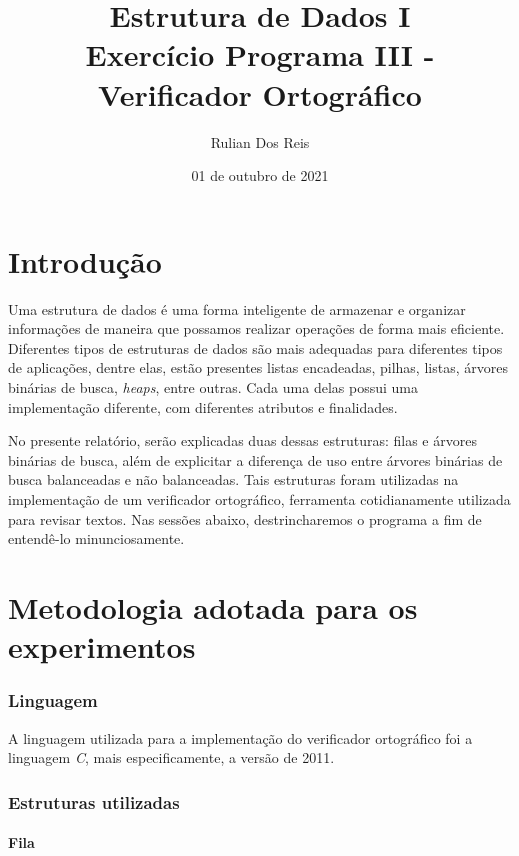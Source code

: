 \documentclass[12pt]{article}
\title{Estrutura de Dados I \\ 
	Exercício Programa III - Verificador Ortográfico	
}
\author{Rulian Dos Reis}
\date{01 de outubro de 2021}
\begin{document}
	\maketitle
	
	\newpage
	
	\tableofcontents
	
	\newpage
	
	\part{Introdução}
	\hrulefill
	
	Uma estrutura de dados é uma forma inteligente de armazenar e organizar informações de maneira que possamos realizar operações de forma mais eficiente. Diferentes tipos de estruturas de dados são mais adequadas para diferentes tipos de aplicações, dentre elas, estão presentes listas encadeadas, pilhas, listas, árvores binárias de busca, \textit{heaps}, entre outras. Cada uma delas possui uma implementação diferente, com diferentes atributos e finalidades.
	
	No presente relatório, serão explicadas duas dessas estruturas: filas e árvores binárias de busca, além de explicitar a diferença de uso entre árvores binárias de busca balanceadas e não balanceadas. Tais estruturas foram utilizadas na implementação de um verificador ortográfico, ferramenta cotidianamente utilizada para revisar textos. Nas sessões abaixo, destrincharemos o programa a fim de entendê-lo minunciosamente.
	
	\part{Metodologia adotada para os experimentos}
	\hrulefill
	
	\section{Linguagem}
	
	A linguagem utilizada para a implementação do verificador ortográfico foi a linguagem \textit{C}, mais especificamente, a versão de 2011.
	
	\section{Estruturas utilizadas}
	\subsection{Fila}
		
\end{document}

